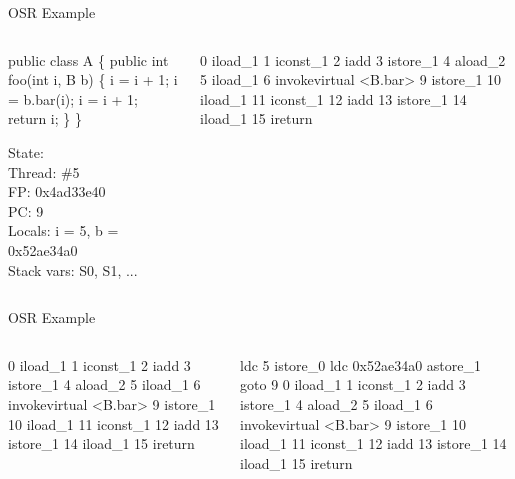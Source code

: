 {
\begin{frame}[t,fragile]{OSR Example}%
\begin{footnotesize}
\begin{columns}[t]

\begin{column}{0.4\paperwidth}
\begin{semiverbatim}
public class A \{
  public int foo(int i, B b) \{
    i = i + 1;
    i = b.bar(i);
    i = i + 1;
    return i;
  \}
\}
\end{semiverbatim}

 {
State: \\
Thread: \#5 \\
FP: 0x4ad33e40 \\
PC: 9 \\
Locals: i = 5, b = 0x52ae34a0 \\
Stack vars: S0, S1, ... \\
}
\end{column}

\begin{column}{0.4\paperwidth}
\begin{semiverbatim}
 0 iload\_1
 1 iconst\_1
 2 iadd
 3 istore\_1
 4 aload\_2
 5 iload\_1
 6 invokevirtual <B.bar>
 9 istore\_1
10 iload\_1
11 iconst\_1
12 iadd
13 istore\_1
14 iload\_1
15 ireturn
\end{semiverbatim}
\end{column}
\end{columns}
\end{footnotesize}
\end{frame}
}

{
\begin{frame}[t,fragile,shrink=20]{OSR Example}%
\begin{footnotesize}
\begin{columns}[b]

\begin{column}{0.4\paperwidth}
\begin{semiverbatim}
 0 iload\_1
 1 iconst\_1
 2 iadd
 3 istore\_1
 4 aload\_2
 5 iload\_1
 6 invokevirtual <B.bar>
 9 istore\_1
10 iload\_1
11 iconst\_1
12 iadd
13 istore\_1
14 iload\_1
15 ireturn
\end{semiverbatim}
\end{column}

\begin{column}{0.4\paperwidth}
\begin{semiverbatim}
   ldc 5
   istore\_0 
   ldc 0x52ae34a0
   astore\_1
   goto 9
 0 iload\_1
 1 iconst\_1
 2 iadd
 3 istore\_1
 4 aload\_2
 5 iload\_1
 6 invokevirtual <B.bar>
 9 istore\_1
10 iload\_1
11 iconst\_1
12 iadd
13 istore\_1
14 iload\_1
15 ireturn
\end{semiverbatim}
\end{column}

\end{columns}
\end{footnotesize}
\end{frame}
}

